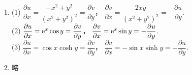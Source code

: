 \begin{enumerate}[label={\textbf{\arabic*.}},leftmargin=
    \inteval{\myenumleftmargin}pt]
\item (1) $ \dfrac{\partial u}{\partial x} =
\dfrac{-x^2+y^2}{(x^2+y^2)^2}=\dfrac{\partial v}{\partial y} $，
$ \dfrac{\partial v}{\partial x} =\dfrac{2xy}{(x^2+y^2)^2}=
-\dfrac{\partial u}{\partial y} $. \\
(2) $ \dfrac{\partial u}{\partial x} =\mathrm{e}^x \cos y=
\dfrac{\partial v}{\partial y} $，
$ \dfrac{\partial v}{\partial x} =\mathrm{e}^x \sin y=
-\dfrac{\partial u}{\partial y} $. \\
(3) $ \dfrac{\partial u}{\partial x} =\cos x\cosh y=
\dfrac{\partial v}{\partial y} $，
$ \dfrac{\partial v}{\partial x} = -\sin x\sinh y=
-\dfrac{\partial u}{\partial y} $. 

\item 略

\end{enumerate}
\myfootnote{\CopyrightStatementChap}
\cleardoublepage



